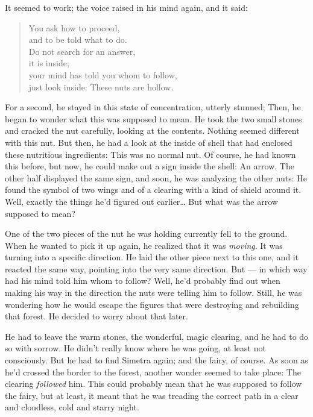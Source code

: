 It seemed to work; the voice raised in his mind again, and it said: 
\begin{quote}
You ask how to proceed,\\
and to be told what to do.\\
Do not search for an answer,\\
it is inside;\\
your mind has told you whom to follow,\\
just look inside: These nuts are hollow.
\end{quote}
For a second, he stayed in this state of concentration, utterly stunned; Then, he began to wonder what this was supposed to mean. He took the two small stones and cracked the nut carefully, looking at the contents. Nothing seemed different with this nut. But then, he had a look at the inside of shell that had enclosed these nutritious ingredients: This was no normal nut.
Of course, he had known this before, but now, he could make out a sign inside the shell: An arrow. The other half displayed the same sign, and soon, he was analyzing the other nuts: He found the symbol of two wings and of a clearing with a kind of shield around it. Well, exactly the things he'd figured out earlier\dots
But what was the arrow supposed to mean? 

One of the two pieces of the nut he was holding currently fell to the ground. When he wanted to pick it up again, he realized that it was \emph{moving}. It was turning into a specific direction. He laid the other piece next to this one, and it reacted the same way, pointing into the very same direction. But --- in which way had his mind told him whom to follow? 
Well, he'd probably find out when making his way in the direction the nuts were telling him to follow. Still, he was wondering how he would escape the figures that were destroying and rebuilding that forest. He decided to worry about that later.

He had to leave the warm stones, the wonderful, magic clearing, and he had to do so with sorrow. He didn't really know where he was going, at least not consciously. But he had to find Simetra again; and the fairy, of course. 
As soon as he'd crossed the border to the forest, another wonder seemed to take place: The clearing \emph{followed} him. This could probably mean that he was supposed to follow the fairy, but at least, it meant that he was treading the correct path in a clear and cloudless, cold and starry night. 
